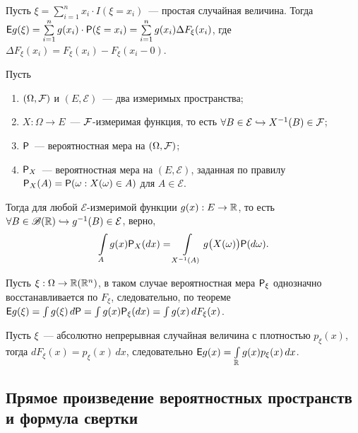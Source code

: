 Пусть $\xi = \sum\limits_{i = 1}^n x_i \cdot I (\xi = x_i)$~--- простая случайная величина. Тогда $\E g(\xi) = \sum\limits_{i=1}^{n} g(x_i) \cdot \P(\xi = x_i) = \sum\limits_{i = 1}^n g(x_i) \Delta F_\xi (x_i)$, где $\Delta F_\xi(x_i) = F_\xi(x_i) - F_\xi (x_i - 0)$.

\begin{theorem}
	Пусть 
	\begin{enumerate}
	    \item $(\Omega, \F)$ и $(E, \mathcal{E})$~--- два измеримых пространства;
	    \item $X : \Omega \rightarrow E$~--- $\F$-измеримая функция, то есть $\forall B \in \mathcal{E} \hookrightarrow X^{-1}(B) \in \F$;
	    \item $\P$~--- вероятностная мера на $(\Omega, \F)$;
	    \item $\P_X$~--- вероятностная мера на $(E, \mathcal{E})$, заданная по правилу $\P_X(A) = \P (\omega: X(\omega) \in A)$ для $A \in \mathcal{E}$.
	\end{enumerate}
	
	Тогда для любой $\mathcal{E}$-измеримой функции $g(x):E \rightarrow \R$, то есть $\forall B \in \B(\R) \hookrightarrow g^{-1}(B) \in \mathcal{E}$, верно, 
	$$\int\limits_A g(x) \P_X(dx) = \int\limits_{X^{-1}(A)} g\big( X(\omega) \big) \P(d \omega).$$
\end{theorem}

\begin{consequence}[1]
    Пусть $\xi : \Omega \rightarrow \R (\R^n)$, в таком случае вероятностная мера $\P_\xi$ однозначно восстанавливается по $F_\xi$, следовательно, по теореме $\E g(\xi) = \int g(\xi) \, d\P = \int g(x) \P_\xi(dx) = \int g(x) \, d F_\xi (x)$.
\end{consequence}
\begin{consequence}[2]
    Пусть  $\xi$~--- абсолютно непрерывная случайная величина с плотностью $p_\xi(x)$, тогда $d F_\xi (x) = p_\xi (x) \, dx$, следовательно $\E g(x) = \int\limits_{\R} g(x) p_\xi(x) \, d x$.
\end{consequence}

\subsection{Прямое произведение вероятностных пространств и формула свертки}

